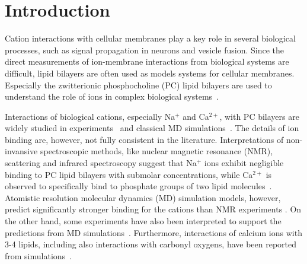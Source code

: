 \documentclass[aip,jcp,twocolumn]{revtex4}
\begin{document}
\section{Introduction}
Cation interactions with cellular membranes play a key role in several biological processes,
such as signal propagation in neurons and vesicle fusion.
Since the direct measurements of ion-membrane interactions from biological systems
are difficult, lipid bilayers are often used as models systems for cellular
membranes. Especially the zwitterionic phosphocholine (PC) lipid bilayers are
used to understand the role of ions in complex biological
systems~\cite{scherer87,seelig90,cevc90}.

Interactions of biological cations, especially Na$^+$ and
Ca$^{2+}$, with PC bilayers are widely studied in
experiments~\cite{akutsu81,altenbach84,seelig90,cevc90,tocanne90,binder02,pabst07,uhrikova08}
and classical MD simulations~\cite{bockmann03,bockmann04,Berkowitz12,melcrova16,javanainen17}.
The details of ion binding are, however, not fully consistent in the literature.
Interpretations of non-invansive spectroscopic methods, like nuclear magnetic resonance (NMR), scattering
and infrared spectroscopy suggest that Na$^+$ ions exhibit
negligible binding to PC lipid bilayers with submolar concentrations, while Ca$^{2+}$ is observed to specifically
bind to phosphate groups of two lipid molecules~\cite{hauser76,hauser78,herbette84,akutsu81,altenbach84,binder02,pabst07,uhrikova08}.
Atomistic resolution molecular dynamics (MD) simulation models, however, predict significantly
stronger binding for the cations than NMR experiments \cite{catte16}.
On the other hand, some experiments have also been interpreted to support the predictions from
MD simulations~\cite{bockmann03,vacha09a}. 
Furthermore, interactions of calcium ions with 3-4 lipids,
including also interactions with carbonyl
oxygens, have been reported from simulations~\cite{bockmann03,bockmann04,melcrova16,javanainen17}.
\end{document}

